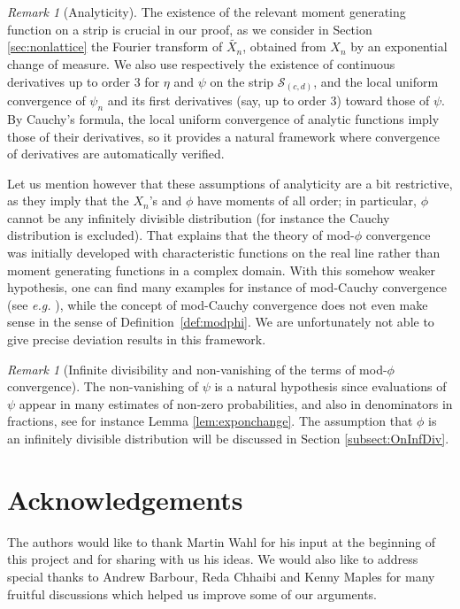 \documentclass[12pt,a4paper,reqno]{amsart}
\theoremstyle{remark}
\newtheorem{remark}[lemma]{Remark}
\begin{document}
\begin{remark}[Analyticity]
The existence of the relevant moment generating function on a strip is crucial in our proof, as we consider in Section \ref{sec:nonlattice} the Fourier transform of $\widetilde{X_n}$, obtained from $X_n$ by an exponential change of measure. We also use respectively the existence of continuous derivatives up to order $3$ for $\eta$ and $\psi$ on the strip $\mathcal{S}_{(c,d)}$, and the local uniform convergence of $\psi_n$ and its first derivatives (say, up to order $3$) toward those of $\psi$. By Cauchy's formula, the local uniform convergence of analytic functions imply those of their derivatives, so it provides a natural framework where convergence of derivatives are automatically verified.
\medskip

Let us mention however that these assumptions of analyticity are a bit restrictive, as they imply that the $X_{n}$'s and $\phi$ have moments of all order; in particular, $\phi$ cannot be any infinitely divisible distribution (for instance the Cauchy distribution is excluded). That explains that the theory of mod-$\phi$ convergence was initially developed with characteristic functions on the real line  rather than moment generating functions in a complex domain. With this somehow weaker hypothesis, one can find many examples for instance of mod-Cauchy convergence (see \emph{e.g.} \cite{DKN11,KNN13}), while the concept of mod-Cauchy convergence does not even make sense in the sense of Definition~\ref{def:modphi}. We are unfortunately not able to give precise deviation results  in this framework.
\end{remark}\medskip

\begin{remark}[Infinite divisibility and non-vanishing of the terms of mod-$\phi$ convergence]
The non-vanishing of $\psi$ is a natural hypothesis since evaluations of $\psi$ appear in many estimates of non-zero probabilities, and also in denominators in fractions, see for instance Lemma \ref{lem:exponchange}. 
The assumption that $\phi$ is an infinitely divisible distribution 
will be discussed in Section \ref{subsect:OnInfDiv}.
\end{remark}
\bigskip




\section*{Acknowledgements}
The authors would like to thank Martin Wahl for his input at the beginning of this project and for sharing with us his ideas. We would also like to address special thanks to Andrew Barbour, Reda Chhaibi and Kenny Maples for many fruitful discussions which helped us improve some of our arguments.
\bigskip
\bigskip
\end{document}
